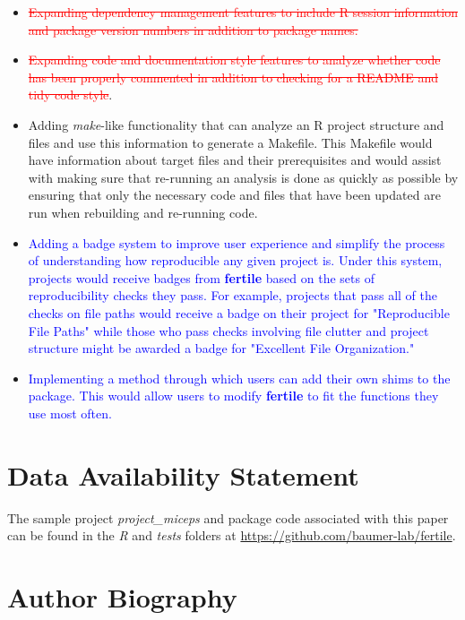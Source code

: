 \documentclass[APA,LATO1COL]{WileyNJD-v2}\usepackage[]{graphicx}\usepackage[]{color}
\newcommand{\R}{\textsf{R}\xspace}
\newcommand{\cmd}[1]{\textit{#1}}
\newcommand{\pkg}[1]{\textbf{#1}}
\begin{document}
\begin{itemize} [noitemsep]
  \item \textcolor{red}{\st{Expanding dependency management features to include R session information and package version numbers in addition to package names.}}
  \item \textcolor{red}{\st{Expanding code and documentation style features to analyze whether code has been properly commented in addition to checking for a README and tidy code style}}.
  \item Adding \cmd{make}-like functionality that can analyze an \R project structure and files and use this information to generate a Makefile. This Makefile would have information about target files and their prerequisites and would assist with making sure that re-running an analysis is done as quickly as possible by ensuring that only the necessary code and files that have been updated are run when rebuilding and re-running code.
  \item \textcolor{blue}{Adding a badge system to improve user experience and simplify the process of understanding how reproducible any given project is. Under this system, projects would receive badges from \pkg{fertile} based on the sets of reproducibility checks they pass. For example, projects that pass all of the checks on file paths would receive a badge on their project for "Reproducible File Paths" while those who pass checks involving file clutter and project structure might be awarded a badge for "Excellent File Organization."}
  \item \textcolor{blue}{Implementing a method through which users can add their own shims to the package. This would allow users to modify \pkg{fertile} to fit the functions they use most often. }
\end{itemize}


\section*{Data Availability Statement}
The sample project \cmd{project\_miceps} and package code associated with this paper can be found in the \cmd{R} and \cmd{tests} folders at \url{https://github.com/baumer-lab/fertile}.

\nocite{*}%
%





\section*{Author Biography}
\end{document}
